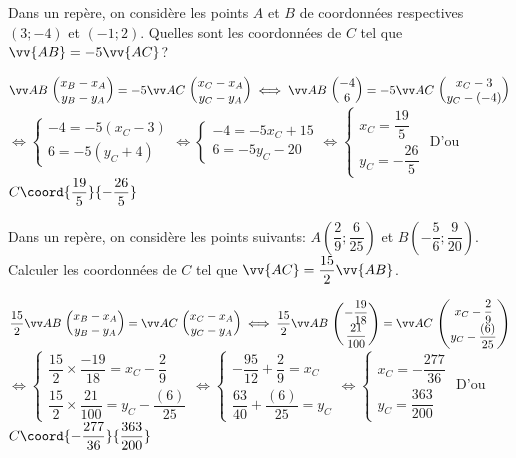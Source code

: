 \documentclass[11pt,a4paper]{article}  %
\begin{document}
\begin{exercice}{}
	Dans un repère, on considère les points $A$ et $B$ de coordonnées respectives $(3;-4)$ et $(-1; 2)$. Quelles sont les coordonnées de $C$ tel que $\vv{AB}=-5\vv{AC}$?
	\begin{corrBox}
		$\Coord{AB}{x_B-x_A}{y_B-y_A}=-5\Coord{AC}{x_C-x_A}{y_C-y_A}\iff \Coord{AB}{-4}{6}=-5\Coord{AC}{x_C-3}{y_C-(-4)}$\\
		$\iff \begin{cases*}
			-4=-5(x_C-3)\\
			6=-5(y_C+4)
		\end{cases*} \iff \begin{cases*}
		-4=-5x_C+15\\
		6=-5y_C-20
	\end{cases*} \iff \begin{cases*}
	x_C=\dfrac{19}{5}\\
	y_C=-\dfrac{26}{5}
\end{cases*}$
		D'ou $C\coord{\dfrac{19}{5}}{-\dfrac{26}{5}}$
	\end{corrBox}
\end{exercice}

\begin{exercice}{}
	Dans un repère, on considère les points suivants: $A\left(\dfrac{2}{ 9};\dfrac{6}{25}\right)$ et $B\left(-\dfrac{5}{6};\dfrac{9}{20}\right)$.\\
	Calculer les coordonnées de $C$ tel que $\vv{AC}=\dfrac{15}{2}\vv{AB}$.
	\begin{corrBox}
		$\dfrac{15}{2}\Coord{AB}{x_B-x_A}{y_B-y_A}=\Coord{AC}{x_C-x_A}{y_C-y_A}\iff \dfrac{15}{2}\Coord{AB}{-\dfrac{19}{18}}{\dfrac{21}{100}}=\Coord{AC}{x_C-\dfrac{2}{9}}{y_C-\dfrac{(6)}{25}}$\\
		$\iff \begin{cases*}
			\dfrac{15}{2}\times \dfrac{-19}{18}=x_C-\dfrac{2}{9}\\
			\dfrac{15}{2} \times \dfrac{21}{100}=y_C-\dfrac{(6)}{25}
		\end{cases*} \iff \begin{cases*}
			-\dfrac{95}{12}+\dfrac{2}{9}=x_C\\
			\dfrac{63}{40}+\dfrac{(6)}{25}=y_C
		\end{cases*} \iff \begin{cases*}
			x_C=-\dfrac{277}{36}\\
			y_C=\dfrac{363}{200}
		\end{cases*}$
		D'ou $C\coord{-\dfrac{277}{36}}{\dfrac{363}{200}}$
	\end{corrBox}
\end{exercice}
\end{document}
